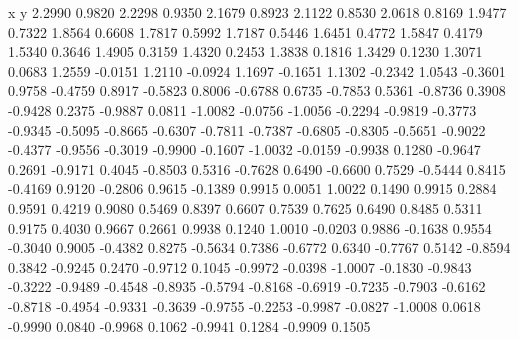     x y
    2.2990    0.9820
    2.2298    0.9350
    2.1679    0.8923
    2.1122    0.8530
    2.0618    0.8169
    1.9477    0.7322
    1.8564    0.6608
    1.7817    0.5992
    1.7187    0.5446
    1.6451    0.4772
    1.5847    0.4179
    1.5340    0.3646
    1.4905    0.3159
    1.4320    0.2453
    1.3838    0.1816
    1.3429    0.1230
    1.3071    0.0683
    1.2559   -0.0151
    1.2110   -0.0924
    1.1697   -0.1651
    1.1302   -0.2342
    1.0543   -0.3601
    0.9758   -0.4759
    0.8917   -0.5823
    0.8006   -0.6788
    0.6735   -0.7853
    0.5361   -0.8736
    0.3908   -0.9428
    0.2375   -0.9887
    0.0811   -1.0082
   -0.0756   -1.0056
   -0.2294   -0.9819
   -0.3773   -0.9345
   -0.5095   -0.8665
   -0.6307   -0.7811
   -0.7387   -0.6805
   -0.8305   -0.5651
   -0.9022   -0.4377
   -0.9556   -0.3019
   -0.9900   -0.1607
   -1.0032   -0.0159
   -0.9938    0.1280
   -0.9647    0.2691
   -0.9171    0.4045
   -0.8503    0.5316
   -0.7628    0.6490
   -0.6600    0.7529
   -0.5444    0.8415
   -0.4169    0.9120
   -0.2806    0.9615
   -0.1389    0.9915
    0.0051    1.0022
    0.1490    0.9915
    0.2884    0.9591
    0.4219    0.9080
    0.5469    0.8397
    0.6607    0.7539
    0.7625    0.6490
    0.8485    0.5311
    0.9175    0.4030
    0.9667    0.2661
    0.9938    0.1240
    1.0010   -0.0203
    0.9886   -0.1638
    0.9554   -0.3040
    0.9005   -0.4382
    0.8275   -0.5634
    0.7386   -0.6772
    0.6340   -0.7767
    0.5142   -0.8594
    0.3842   -0.9245
    0.2470   -0.9712
    0.1045   -0.9972
   -0.0398   -1.0007
   -0.1830   -0.9843
   -0.3222   -0.9489
   -0.4548   -0.8935
   -0.5794   -0.8168
   -0.6919   -0.7235
   -0.7903   -0.6162
   -0.8718   -0.4954
   -0.9331   -0.3639
   -0.9755   -0.2253
   -0.9987   -0.0827
   -1.0008    0.0618
   -0.9990    0.0840
   -0.9968    0.1062
   -0.9941    0.1284
   -0.9909    0.1505